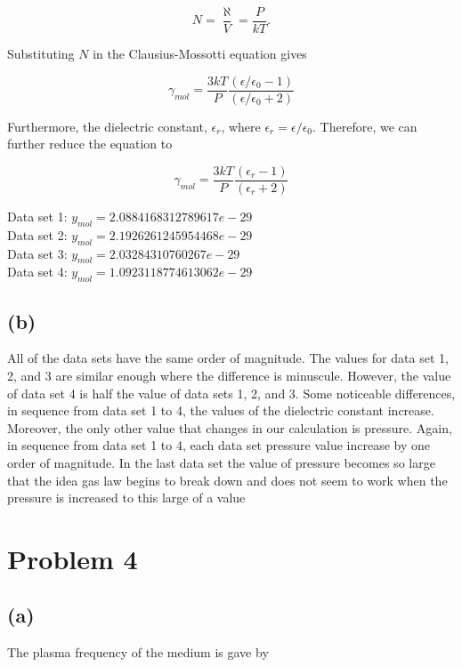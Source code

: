 \documentclass[11pt]{article}
\begin{document}
$$
N = \frac{\aleph}{V} = \frac{P}{kT}.
$$

Substituting $N$ in the Clausius-Mossotti equation gives

$$
\gamma_{mol} = \frac{3kT}{P} \frac{(\epsilon/\epsilon_{0} - 1)}{(\epsilon/\epsilon_{0} + 2)}
$$

Furthermore, the dielectric constant, $\epsilon_{r}$, where $\epsilon_{r} = \epsilon/\epsilon_{0}$. Therefore, we can further reduce the equation to 

$$
\gamma_{mol} = \frac{3kT}{P} \frac{(\epsilon_{r} - 1)}{(\epsilon_{r} + 2)}
$$

\begin{center}
Data set 1: $y_{mol} = 2.0884168312789617e-29$\\
Data set 2: $y_{mol} = 2.1926261245954468e-29$\\
Data set 3: $y_{mol} = 2.03284310760267e-29$\\
Data set 4: $y_{mol} = 1.0923118774613062e-29$\\
\end{center}

\subsection*{(b)}

All of the data sets have the same order of magnitude. The values for data set 1, 2, and 3 are similar enough where the difference is minuscule. However, the value of data set 4 is half the value of data sets 1, 2, and 3. Some noticeable differences, in sequence from data set 1 to 4, the values of the dielectric constant increase. Moreover, the only other value that changes in our calculation is pressure. Again, in sequence from data set 1 to 4, each data set pressure value increase by one order of magnitude. In the last data set the value of pressure becomes so large that the idea gas law begins to break down and does not seem to work when the pressure is increased to this large of a value

\clearpage

\section*{Problem 4}

\subsection*{(a)}

The plasma frequency of the medium is gave by
\end{document}
